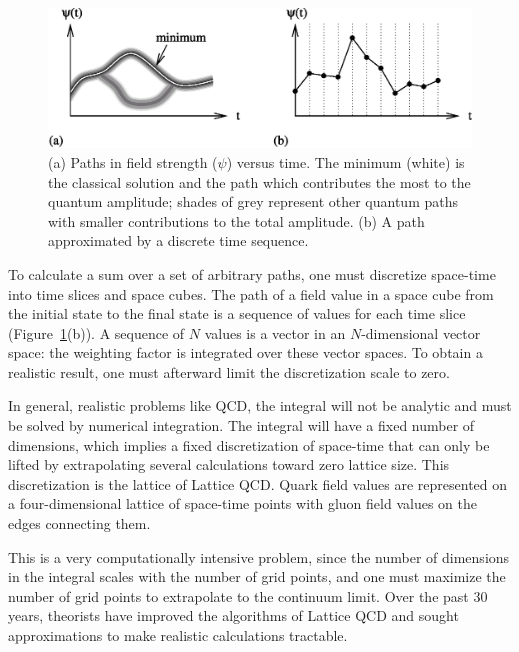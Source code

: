 \documentclass{cornell}
\begin{document}
\begin{figure}[p]
  \begin{center}
    \includegraphics[width=\linewidth]{pathintegrals}
  \end{center}
  \caption[Path integrals and path integrals in discretized
  space-time]{\label{pathintegrals} (a) Paths in field strength
  ($\psi$) versus time.  The minimum (white) is the classical solution
  and the path which contributes the most to the quantum amplitude;
  shades of grey represent other quantum paths with smaller
  contributions to the total amplitude.  (b) A path approximated by a
  discrete time sequence.}
\end{figure}

To calculate a sum over a set of arbitrary paths, one must discretize
space-time into time slices and space cubes.  The path of a field
value in a space cube from the initial state to the final state is a
sequence of values for each time slice (Figure~\ref{pathintegrals}(b)).
A sequence of $N$ values is a vector in an $N$-dimensional vector
space: the weighting factor is integrated over these vector spaces.
To obtain a realistic result, one must afterward limit the
discretization scale to zero.

In general, realistic problems like QCD, the integral will not be
analytic and must be solved by numerical integration.  The integral
will have a fixed number of dimensions, which implies a fixed
discretization of space-time that can only be lifted by extrapolating
several calculations toward zero lattice size.  This discretization is
the lattice of Lattice QCD.  Quark field values are represented on a
four-dimensional lattice of space-time points with gluon field values
on the edges connecting them.

This is a very computationally intensive problem, since the number of
dimensions in the integral scales with the number of grid points, and
one must maximize the number of grid points to extrapolate to the
continuum limit.  Over the past 30 years, theorists have improved the
algorithms of Lattice QCD and sought approximations to make realistic
calculations tractable.
\end{document}

